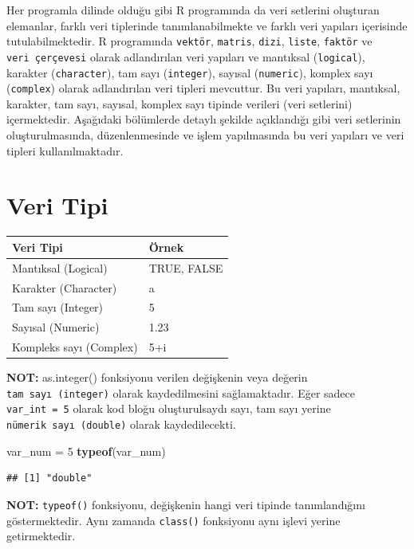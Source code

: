 \documentclass[
]{book}
\newenvironment{Shaded}{\begin{snugshade}}{\end{snugshade}}
\newcommand{\DecValTok}[1]{\textcolor[rgb]{0.00,0.00,0.81}{#1}}
\newcommand{\FunctionTok}[1]{\textcolor[rgb]{0.13,0.29,0.53}{\textbf{#1}}}
\newcommand{\NormalTok}[1]{#1}
\newcommand{\OtherTok}[1]{\textcolor[rgb]{0.56,0.35,0.01}{#1}}
\begin{document}
Her programla dilinde olduğu gibi R programında da veri setlerini oluşturan elemanlar, farklı veri tiplerinde tanımlanabilmekte ve farklı veri yapıları içerisinde tutulabilmektedir. R programında \texttt{vektör}, \texttt{matris}, \texttt{dizi}, \texttt{liste}, \texttt{faktör} ve \texttt{veri\ çerçevesi} olarak adlandırılan veri yapıları ve mantıksal (\texttt{logical}), karakter (\texttt{character}), tam sayı (\texttt{integer}), sayısal (\texttt{numeric}), komplex sayı (\texttt{complex}) olarak adlandırılan veri tipleri mevcuttur. Bu veri yapıları, mantıksal, karakter, tam sayı, sayısal, komplex sayı tipinde verileri (veri setlerini) içermektedir. Aşağıdaki bölümlerde detaylı şekilde açıklandığı gibi veri setlerinin oluşturulmasında, düzenlenmesinde ve işlem yapılmasında bu veri yapıları ve veri tipleri kullanılmaktadır.

\section{Veri Tipi}\label{veri-tipi}

\begin{tabular}{ll}
\toprule
Veri Tipi & Örnek\\
\midrule
Mantıksal (Logical) & TRUE, FALSE\\
Karakter (Character) & a\\
Tam sayı (Integer) & 5\\
Sayısal (Numeric) & 1.23\\
Kompleks sayı (Complex) & 5+i\\
\bottomrule
\end{tabular}

\textbf{NOT:} as.integer() fonksiyonu verilen değişkenin veya değerin \texttt{tam\ sayı\ (integer)} olarak kaydedilmesini sağlamaktadır. Eğer sadece \texttt{var\_int\ =\ 5} olarak kod bloğu oluşturulsaydı sayı, tam sayı yerine \texttt{nümerik\ sayı\ (double)} olarak kaydedilecekti.

\begin{Shaded}
\begin{Highlighting}[]
\NormalTok{var\_num }\OtherTok{=} \DecValTok{5}
\FunctionTok{typeof}\NormalTok{(var\_num) }
\end{Highlighting}
\end{Shaded}

\begin{verbatim}
## [1] "double"
\end{verbatim}

\textbf{NOT:} \texttt{typeof()} fonksiyonu, değişkenin hangi veri tipinde tanımlandığını göstermektedir. Aynı zamanda \texttt{class()} fonksiyonu aynı işlevi yerine getirmektedir.
\end{document}
